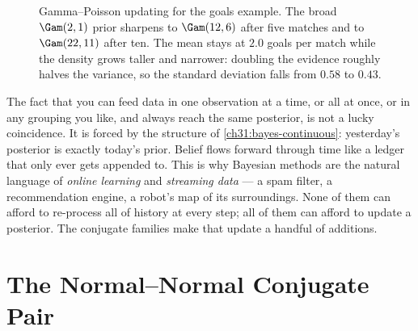 \begin{figure}[H]
\centering
{}
\caption{Gamma--Poisson updating for the goals example. The broad $\Gam(2,1)$ prior
sharpens to $\Gam(12,6)$ after five matches and to $\Gam(22,11)$ after ten. The mean stays
at $2.0$ goals per match while the density grows taller and narrower: doubling the evidence
roughly halves the variance, so the standard deviation falls from $0.58$ to $0.43$.}
\label{ch31:fig-gammapoisson}
\end{figure}

\begin{aestheticbox}
The fact that you can feed data in one observation at a time, or all at once, or in any
grouping you like, and always reach the same posterior, is not a lucky coincidence. It is
forced by the structure of \eqref{ch31:bayes-continuous}: yesterday's posterior is exactly
today's prior. Belief flows forward through time like a ledger that only ever gets
appended to. This is why Bayesian methods are the natural language of \emph{online
learning} and \emph{streaming data} --- a spam filter, a recommendation engine, a robot's
map of its surroundings. None of them can afford to re-process all of history at every
step; all of them can afford to update a posterior. The conjugate families make that update
a handful of additions.
\end{aestheticbox}

\section{The Normal--Normal Conjugate Pair}
\label{ch31:normal-normal}

